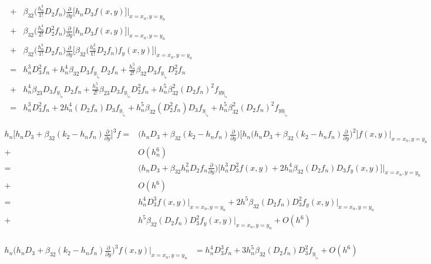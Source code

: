 \documentclass[12 pt]{article}
\begin{document}
{\begin{align*}
	+& \beta_{32}\bigg(\frac{h_{n}^{3}}{1!}D_{2}f_{n}\bigg)\frac{\partial}{\partial y}\bigg[h_{n}D_{3}f(x,y)\bigg]\bigg\vert_{x = x_{n}, y= y_{n}}  \\
	+& \beta_{32}\bigg(\frac{h_{n}^{4}}{2!}D_{2}^{2}f_{n}\bigg)\frac{\partial}{\partial y}\bigg[h_{n}D_{3}f(x,y)\bigg]\bigg\vert_{x = x_{n}, y= y_{n}}\\ 
	+& \beta_{32}\bigg(\frac{h_{n}^{3}}{1!}D_{2}f_{n}\bigg)\frac{\partial}{\partial y}\bigg[\beta_{32}\bigg(\frac{h_{n}^{2}}{1!}D_{2}f_{n}\bigg)f_{y}(x,y)\bigg]\bigg\vert_{x = x_{n}, y= y_{n}}\\
	=& h_{n}^{3}D_{3}^{2}f_{n} + h_{n}^{4}\beta_{32}D_{3}f_{y_{|_{n}}}D_{2}f_{n} + \frac{h_{n}^{5}}{2!}\beta_{32}D_{3}f_{y_{|_{n}}}D_{2}^{2}f_{n}\\
	+& h_{n}^{4}\beta_{23}D_{3}f_{y_{|_{n}}}D_{2}f_{n} + \frac{h_{n}^{5}}{2!}\beta_{23}D_{3}f_{y_{|_{n}}}D_{2}^{2}f_{n} + h_{n}^{5}\beta_{32}^{2}(D_{2}f_{n})^{2}f_{yy_{|_{n}}}\\
	=& h_{n}^{3}D_{3}^{2}f_{n} + 2h_{n}^{4}(D_{2}f_{n})D_{3}f_{y_{|_{n}}} + h_{n}^{5}\beta_{32}(D_{2}^{2}f_{n})D_{3}f_{y_{|_{n}}} + h_{n}^{5}\beta_{32}^{2}(D_{2}f_{n})^{2}f_{yy_{|_{n}}}							
\end{align*}
}

\begin{align*}
h_{n}\bigg[h_{n}D_{3}+\beta_{32}(k_{2}-h_{n}f_{n})\frac{\partial}{\partial y}\bigg]^{3}f =& \bigg(h_{n}D_{3}+\beta_{32}(k_{2}-h_{n}f_{n})\frac{\partial}{\partial y}\bigg)\bigg[h_{n}\bigg(h_{n}D_{3}+\beta_{32}(k_{2}-h_{n}f_{n})\frac{\partial}{\partial y}\bigg)^{2}\bigg]f(x,y)\bigg\vert_{x = x_{n}, y= y_{n}} \\
    +& O(h_{n}^{6})\\
	=& \bigg(h_{n}D_{3}+\beta_{32}h_{n}^{2}D_{2}f_{n}\frac{\partial}{\partial y}\bigg)\bigg[h_{n}^{3}D_{3}^{2}f(x,y) + 2h_{n}^{4}\beta_{32}(D_{2}f_{n})D_{3}f_{y}(x,y)\bigg]\bigg\vert_{x = x_{n}, y= y_{n}} \\
	+& O(h^{6})\\
	=& h_{n}^{4}D_{3}^{3}f(x,y)\bigg\vert_{x = x_{n}, y= y_{n}} + 2h^{5}\beta_{32}(D_{2}f_{n})D_{3}^{2}f_{y}(x,y)\bigg\vert_{x = x_{n}, y= y_{n}} \\
	+& h^{5}\beta_{32}(D_{2}f_{n})D_{3}^{2}f_{y}(x,y)\bigg\vert_{x = x_{n}, y= y_{n}} + O(h^{6})\\
\end{align*}

\begin{align*}
h_{n}\bigg(h_{n}D_{3}+\beta_{32}(k_{2}-h_{n}f_{n})\frac{\partial}{\partial y}\bigg)^{3}f(x,y)\bigg\vert_{x = x_{n}, y= y_{n}} &= h_{n}^{4}D_{3}^{3}f_{n} + 3h_{n}^{5}\beta_{32}(D_{2}f_{n})D_{3}^{2}f_{y_{|_{n}}} + O(h^{6})	
\end{align*}
\end{document}
